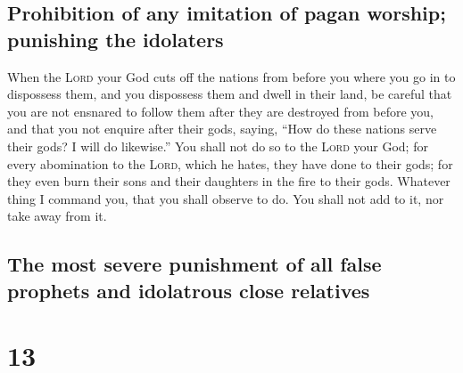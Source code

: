 \hypertarget{prohibition-of-any-imitation-of-pagan-worship-punishing-the-idolaters}{%
\subsection{Prohibition of any imitation of pagan worship; punishing the
idolaters}\label{prohibition-of-any-imitation-of-pagan-worship-punishing-the-idolaters}}

 When the \textsc{Lord} your God cuts off the nations
from before you where you go in to dispossess them, and you dispossess
them and dwell in their land,  be careful that you are
not ensnared to follow them after they are destroyed from before you,
and that you not enquire after their gods, saying, ``How do these
nations serve their gods? I will do likewise.''  You
shall not do so to the \textsc{Lord} your God; for every abomination to
the \textsc{Lord}, which he hates, they have done to their gods; for
they even burn their sons and their daughters in the fire to their gods.
 Whatever thing I command you, that you shall observe to
do. You shall not add to it, nor take away from it.

\hypertarget{the-most-severe-punishment-of-all-false-prophets-and-idolatrous-close-relatives}{%
\subsection{The most severe punishment of all false prophets and
idolatrous close
relatives}\label{the-most-severe-punishment-of-all-false-prophets-and-idolatrous-close-relatives}}

\hypertarget{section-12}{%
\section{13}\label{section-12}}

